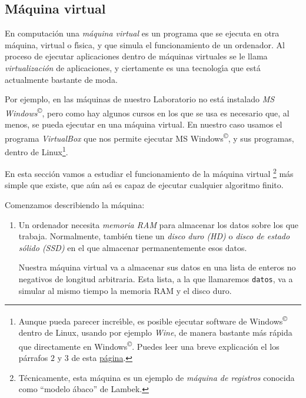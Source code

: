 \begin{appendices}
\chapter{M\'aquina virtual}
En computaci\'on una {\itshape m\'aquina virtual} es un programa que se ejecuta
en otra m\'aquina, virtual o f\'{\i}sica, y que simula el funcionamiento de un 
ordenador. Al proceso de ejecutar aplicaciones dentro de m\'aquinas virtuales 
se le llama {\itshape virtualizaci\'on} de aplicaciones, y ciertamente es una
tecnolog\'{\i}a que est\'a actualmente bastante de moda.

Por ejemplo, en las m\'aquinas de nuestro  Laboratorio no est\'a
instalado 
{\itshape MS Windows}\textsuperscript{\tiny\copyright},  pero como hay algunos
cursos en los que se usa es necesario que, al menos, se pueda ejecutar en una
m\'aquina virtual. En nuestro caso usamos el programa {\itshape VirtualBox} que
nos permite ejecutar MS Windows\textsuperscript{\tiny\copyright}, y sus
programas,  dentro de
Linux\footnote{Aunque pueda parecer incre\'{\i}ble, es posible ejecutar software
de Windows\textsuperscript{\tiny\copyright} dentro de Linux, usando por ejemplo
{\itshape Wine},  de manera
bastante m\'as r\'apida que directamente en 
Windows\textsuperscript{\tiny\copyright}. Puedes leer una breve
explicaci\'on el los p\'arrafos $2$ y $3$ de esta
\href{http://linux.about.com/od/softorther/a/softotherwine.htm}
{p\'agina}.}. 

En esta secci\'on vamos a estudiar el funcionamiento de la m\'aquina virtual
\footnote{T\'ecnicamente, esta m\'aquina es un ejemplo de {\itshape m\'aquina de
registros} conocida como ``modelo \'abaco'' de Lambek.}
m\'as simple que existe, que a\'un as\'{\i} es capaz de ejecutar cualquier
algoritmo finito. 

Comenzamos describiendo la m\'aquina:

\begin{enumerate}
 \item Un ordenador necesita {\itshape memoria RAM} para almacenar los datos
sobre los que trabaja. Normalmente, tambi\'en tiene un {\itshape disco duro
(HD)} 
o {\itshape disco de estado s\'olido (SSD)} en el que almacenar permanentemente
esos datos.

Nuestra m\'aquina virtual va a almacenar sus datos en una lista de enteros no
negativos de longitud arbitraria. 
Esta lista, a la que llamaremos {\tt datos},  va a simular al mismo tiempo la
memoria RAM y el disco duro.


\end{enumerate}
\end{appendices}
